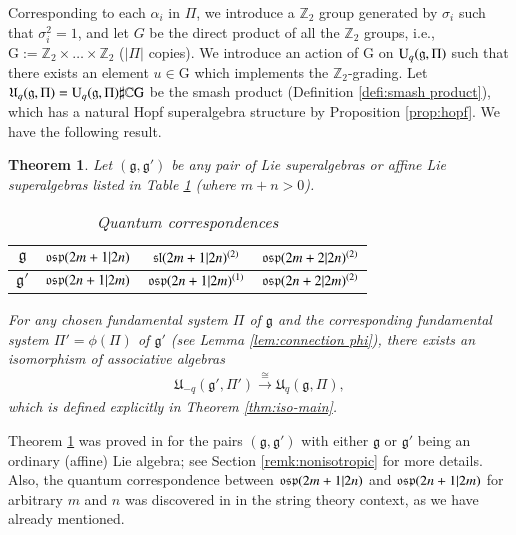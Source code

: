 \documentclass[12pt]{amsart}
\newtheorem{theorem}{Theorem}[section]
\theoremstyle{definition}
\theoremstyle{remark}
\numberwithin{equation}{section}
\begin{document}
Corresponding to each $\alpha_i$ in $\Pi$, we introduce a ${{\mathbb Z}}_2$ group generated by $\sigma_i$ such that $\sigma_i^2=1$, and let $G$ be the direct product of all 
the ${{\mathbb Z}}_2$ groups, i.e.,  $\mathrm{G}:={{\mathbb Z}}_2\times \dots\times {{\mathbb Z}}_2$ ($|\Pi|$ copies).
We introduce an action of  $\mathrm{G}$ on ${{\rm U}}_q({{\mathfrak g}}, \Pi)$ 
such that there exists an element $u\in \mathrm{G}$ which implements the  ${{\mathbb Z}}_2$-grading.
Let ${{\mathfrak U}}_{q}({{\mathfrak g}}, \Pi)={{\rm U}}_{q}({{\mathfrak g}}, \Pi)\sharp{{\mathbb C}}\mathrm{G}$ be the smash product (Definition \ref {defi:smash product}), which
has a natural Hopf superalgebra structure by Proposition \ref{prop:hopf}. 
We have the following result.
\begin{theorem}\label{thm:main-quan}
Let $({{\mathfrak g}}, {{\mathfrak g}}')$ be any pair of Lie superalgebras or affine Lie superalgebras listed in Table \ref{tbl:q-correspond} (where $m+n>0$).

\vspace{-1mm}
\begin{table}[!hbp]

\caption{Quantum correspondences}
\label{tbl:q-correspond}
\begin{tabular}{c|c|c|c}
\hline
${{\mathfrak g}}$ & ${{\rm\mathfrak{osp}}}(2m+1|2n)$ & ${{\rm\mathfrak{sl}}}(2m+1|2n)^{(2)}$  & ${{\rm\mathfrak{osp}}}(2m+2|2n)^{(2)}$ \\
\hline
${{\mathfrak g}}' $ & ${{\rm\mathfrak{osp}}}(2n+1|2m)$ & ${{\rm\mathfrak{osp}}}(2n+1|2m)^{(1)}$ & ${{\rm\mathfrak{osp}}}(2n+2|2m)^{(2)}$  \\
\hline
\end{tabular}
\end{table}

\vspace{-1mm}
\noindent
For any chosen fundamental system $\Pi$ of ${{\mathfrak g}}$ and the corresponding  fundamental system $\Pi'=\phi(\Pi)$ of ${{\mathfrak g}}'$ (see Lemma \ref{lem:connection phi}),  
there exists an isomorphism of associative algebras
\begin{eqnarray*}
{{\mathfrak U}}_{-q}({{\mathfrak g}}', \Pi')\stackrel{\cong}{\longrightarrow}{{\mathfrak U}}_{q}({{\mathfrak g}}, \Pi),
\end{eqnarray*}
which is defined explicitly in Theorem \ref{thm:iso-main}.
\end{theorem}

Theorem \ref{thm:main-quan} was proved in \cite{Z3, Z2} for the pairs $({{\mathfrak g}}, {{\mathfrak g}}')$ with either ${{\mathfrak g}}$ or ${{\mathfrak g}}'$ being an ordinary (affine) Lie algebra; see Section  \ref{remk:nonisotropic} for more details.  Also, the quantum correspondence 
between ${{\rm\mathfrak{osp}}}(2m+1|2n)$ and ${{\rm\mathfrak{osp}}}(2n+1|2m)$  for arbitrary $m$ and $n$
was discovered in \cite{MW} in the string theory context, as we have already mentioned.
\end{document}
